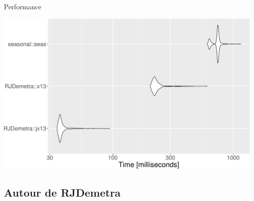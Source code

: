 \documentclass[10pt,xcolor=table,color={dvipsnames,usenames},ignorenonframetext,usepdftitle=false,french]{beamer}
\begin{document}
\begin{frame}{Performance}
\protect\hypertarget{performance}{}

\includegraphics{Diapos/1 - R et JDemetra+_files/figure-beamer/unnamed-chunk-25-1.pdf}

\end{frame}

\hypertarget{autour-de-rjdemetra}{%
\subsection{Autour de RJDemetra}\label{autour-de-rjdemetra}}
\end{document}
